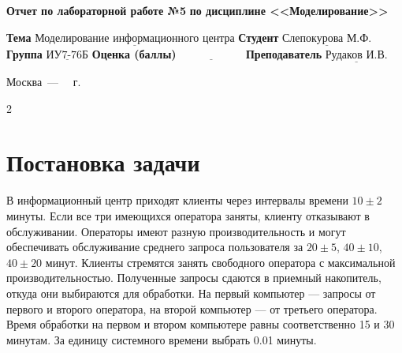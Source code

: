 \documentclass[12pt]{report}
\begin{document}
\begin{titlepage}
		\begin{center}
			\noindent\begin{minipage}{1.1\textwidth}\centering
				\Large\textbf{Отчет по лабораторной работе №5}\newline
				\textbf{по дисциплине <<Моделирование>>}\newline\newline
			\end{minipage}
		\end{center}
		
		\noindent\textbf{Тема} $\underline{\text{Моделирование информационного центра}}$\newline\newline
		\noindent\textbf{Студент} $\underline{\text{Слепокурова М.Ф.}}$\newline\newline
		\noindent\textbf{Группа} $\underline{\text{ИУ7-76Б}}$\newline\newline
		\noindent\textbf{Оценка (баллы)} $\underline{\text{~~~~~~~~~~~~~~~~~}}$\newline\newline
		\noindent\textbf{Преподаватель} $\underline{\text{Рудаков И.В.}}$\newline\newline\newline
		
		\begin{center}
			\vfill
			Москва~---~\the\year
			~г.
		\end{center}
	\end{titlepage}

\setcounter{page} {2}


\section*{Постановка задачи}
В информационный центр приходят клиенты через интервалы времени $10 \pm 2$ минуты. Если все три имеющихся оператора заняты, клиенту отказывают в обслуживании. Операторы имеют разную производительность и могут обеспечивать обслуживание среднего запроса пользователя за $20 \pm 5$, $40 \pm 10$, $40 \pm 20$ минут. Клиенты стремятся занять свободного оператора с максимальной производительностью. Полученные запросы сдаются в приемный накопитель, откуда они выбираются для обработки. На первый компьютер — запросы от первого и второго оператора, на второй компьютер — от третьего оператора. Время обработки на первом и втором компьютере равны соответственно 15 и 30 минутам. За единицу системного времени выбрать 0.01 минуты.
\end{document}

